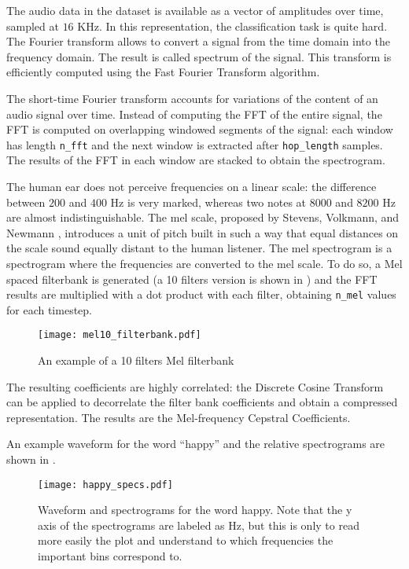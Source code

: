 The audio data in the dataset is available as a vector of amplitudes over time,
sampled at $16$ KHz. In this representation, the classification task is quite
hard.
The Fourier transform allows to convert a signal from the time domain into the
frequency domain. The result is called spectrum of the signal. This transform
is efficiently computed using the Fast Fourier Transform algorithm.

The short-time Fourier transform accounts for variations of the content of an
audio signal over time. Instead of computing the FFT of the entire signal, the
FFT is computed on overlapping windowed segments of the signal: each window has
length \texttt{n_fft} and the next window is extracted after
\texttt{hop_length} samples.
The results of the FFT in each window are stacked to obtain the spectrogram.

The human ear does not perceive frequencies on a linear scale: the difference
between $200$ and $400$ Hz is very marked, whereas two notes at $8000$ and
$8200$ Hz are almost indistinguishable. The mel scale, proposed by Stevens,
Volkmann, and Newmann \cite{melscale1937}, introduces a unit of pitch built in
such a way that equal distances on the scale sound equally distant to the human
listener.
The mel spectrogram is a spectrogram where the frequencies are converted to the
mel scale. To do so, a Mel spaced filterbank is generated (a 10 filters version
is shown in ) and the FFT results are multiplied with
a dot product with each filter, obtaining \texttt{n_mel} values for each
timestep.

\begin{figure}[t!]
    \centering
    \texttt{[image: mel10\_filterbank.pdf]}
    \caption{An example of a 10 filters Mel filterbank}
    \label{fig:mel10_filterbank}
\end{figure}

The resulting coefficients are highly correlated: the Discrete Cosine Transform
can be applied to decorrelate the filter bank coefficients and obtain a
compressed representation.
The results are the Mel-frequency Cepstral Coefficients.

An example waveform for the word ``happy'' and the relative spectrograms are
shown in .

\begin{figure}[t!]
    \centering
    \texttt{[image: happy\_specs.pdf]}
    \caption{Waveform and spectrograms for the word happy. Note that the y axis of the spectrograms are labeled as Hz, but this is only to read more easily the plot and understand to which frequencies the important bins correspond to.}%
    \label{fig:happy_specs}
\end{figure}

